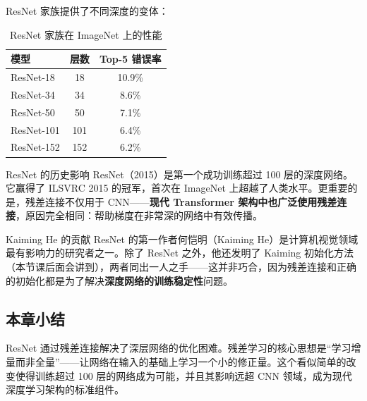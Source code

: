 ResNet 家族提供了不同深度的变体：
\begin{table}[H]
\centering
\begin{tabular}{lcc}
\toprule
\textbf{模型} & \textbf{层数} & \textbf{Top-5 错误率} \\
\midrule
ResNet-18 & 18 & 10.9\% \\
ResNet-34 & 34 & 8.6\% \\
ResNet-50 & 50 & 7.1\% \\
ResNet-101 & 101 & 6.4\% \\
ResNet-152 & 152 & 6.2\% \\
\bottomrule
\end{tabular}
\caption{ResNet 家族在 ImageNet 上的性能}
\end{table}

\begin{importantbox}{ResNet 的历史影响}
ResNet（2015）是第一个成功训练超过 100 层的深度网络。它赢得了 ILSVRC 2015 的冠军，首次在 ImageNet 上超越了人类水平。更重要的是，残差连接不仅用于 CNN——\textbf{现代 Transformer 架构中也广泛使用残差连接}，原因完全相同：帮助梯度在非常深的网络中有效传播。
\end{importantbox}

\begin{knowledgebox}{Kaiming He 的贡献}
ResNet 的第一作者何恺明（Kaiming He）是计算机视觉领域最有影响力的研究者之一。除了 ResNet 之外，他还发明了 Kaiming 初始化方法（本节课后面会讲到），两者同出一人之手——这并非巧合，因为残差连接和正确的初始化都是为了解决\textbf{深度网络的训练稳定性}问题。
\end{knowledgebox}

\subsection{本章小结}

ResNet 通过残差连接解决了深层网络的优化困难。残差学习的核心思想是``学习增量而非全量''——让网络在输入的基础上学习一个小的修正量。这个看似简单的改变使得训练超过 100 层的网络成为可能，并且其影响远超 CNN 领域，成为现代深度学习架构的标准组件。


